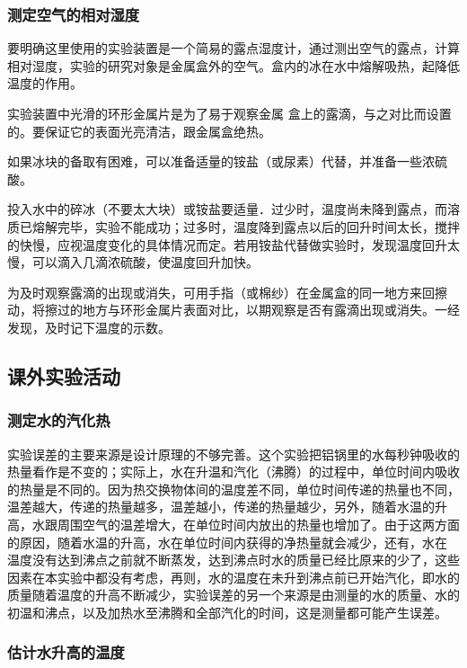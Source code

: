\subsubsection{测定空气的相对湿度}

要明确这里使用的实验装置是一个简易的露点湿度计，通过测出空气的露点，计算相对湿度，实验的研究对象是金属盒外的空气。盒内的冰在水中熔解吸热，起降低温度的作用。

实验装置中光滑的环形金属片是为了易于观察金属
盒上的露滴，与之对比而设置的。要保证它的表面光亮清洁，跟金属盒绝热。

如果冰块的备取有困难，可以准备适量的铵盐（或尿素）代替，并准备一些浓硫酸。

投入水中的碎冰（不要太大块）或铵盐要适量．过少时，温度尚未降到露点，而溶质已熔解完毕，实验不能成功；过多时，温度降到露点以后的回升时间太长，搅拌的快慢，应视温度变化的具体情况而定。若用铵盐代替做实验时，发现温度回升太慢，可以滴入几滴浓硫酸，使温度回升加快。

为及时观察露滴的出现或消失，可用手指（或棉纱）在金属盒的同一地方来回擦动，将擦过的地方与环形金属片表面对比，以期观察是否有露滴出现或消失。一经发现，及时记下温度的示数。

\subsection{课外实验活动}
\subsubsection{测定水的汽化热}

实验误差的主要来源是设计原理的不够完善。这个实验把铝锅里的水每秒钟吸收的热量看作是不变的；实际上，水在升温和汽化（沸腾）的过程中，单位时间内吸收的热量是不同的。因为热交换物体间的温度差不同，单位时间传递的热量也不同，温差越大，传递的热量越多，温差越小，传递的热量越少，另外，随着水温的升高，水跟周围空气的温差增大，在单位时间内放出的热量也增加了。由于这两方面的原因，随着水温的升高，水在单位时间内获得的净热量就会减少，还有，水在
温度没有达到沸点之前就不断蒸发，达到沸点时水的质量已经比原来的少了，这些因素在本实验中都没有考虑，再则，水的温度在未升到沸点前已开始汽化，即水的质量随着温度的升高不断减少，实验误差的另一个来源是由测量的水的质量、水的初温和沸点，以及加热水至沸腾和全部汽化的时间，这是测量都可能产生误差。

\subsubsection{估计水升高的温度}

